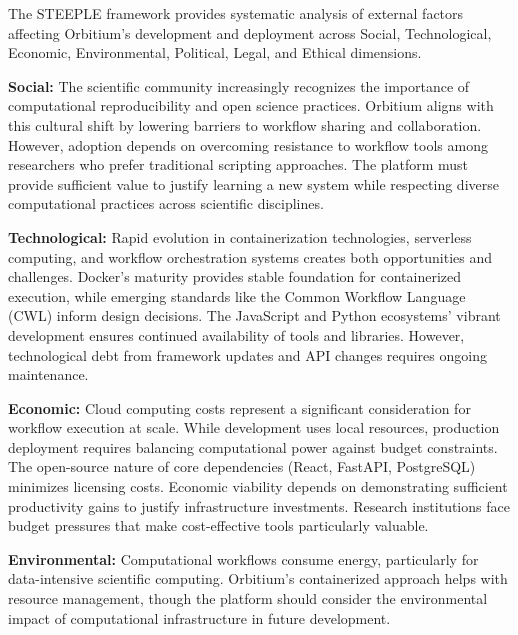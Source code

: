 \documentclass[12pt]{article}
\begin{document}
\hspace{\parindent}The STEEPLE framework provides systematic analysis of external factors affecting Orbitium's development and deployment across Social, Technological, Economic, Environmental, Political, Legal, and Ethical dimensions.

\hspace{\parindent}\textbf{Social:} The scientific community increasingly recognizes the importance of computational reproducibility and open science practices. Orbitium aligns with this cultural shift by lowering barriers to workflow sharing and collaboration. However, adoption depends on overcoming resistance to workflow tools among researchers who prefer traditional scripting approaches. The platform must provide sufficient value to justify learning a new system while respecting diverse computational practices across scientific disciplines.

\hspace{\parindent}\textbf{Technological:} Rapid evolution in containerization technologies, serverless computing, and workflow orchestration systems creates both opportunities and challenges. Docker's maturity provides stable foundation for containerized execution, while emerging standards like the Common Workflow Language (CWL) \cite{amstutz2016common} inform design decisions. The JavaScript and Python ecosystems' vibrant development ensures continued availability of tools and libraries. However, technological debt from framework updates and API changes requires ongoing maintenance.

\hspace{\parindent}\textbf{Economic:} Cloud computing costs represent a significant consideration for workflow execution at scale. While development uses local resources, production deployment requires balancing computational power against budget constraints. The open-source nature of core dependencies (React, FastAPI, PostgreSQL) minimizes licensing costs. Economic viability depends on demonstrating sufficient productivity gains to justify infrastructure investments. Research institutions face budget pressures that make cost-effective tools particularly valuable.

\hspace{\parindent}\textbf{Environmental:} Computational workflows consume energy, particularly for data-intensive scientific computing. Orbitium's containerized approach helps with resource management, though the platform should consider the environmental impact of computational infrastructure in future development.
\end{document}
